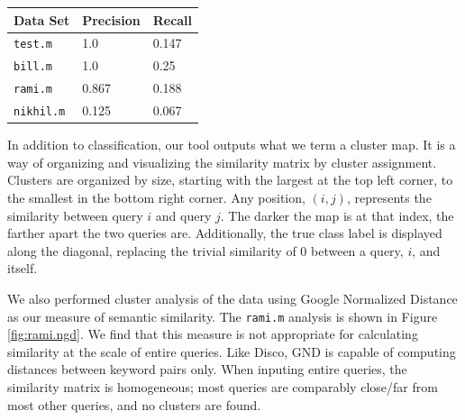 \documentclass[11pt]{article}
\begin{document}
\begin{multicols}{2}
\bigskip
\begin{centering}
    \begin{tabular}{ | l | l | l |}
    \hline
    {\bf Data Set} & {\bf Precision} & {\bf Recall} \\ \hline
    \texttt{test.m} & 1.0 & 0.147 \\ \hline
    \texttt{bill.m} & 1.0 & 0.25 \\ \hline
    \texttt{rami.m} & 0.867 & 0.188 \\ \hline
    \texttt{nikhil.m} & 0.125 & 0.067 \\ \hline
    \end{tabular}
\end{centering}
\bigskip

In addition to classification, our tool outputs what we term a cluster
map. It is a way of organizing and visualizing the similarity matrix
by cluster assignment. Clusters are organized by size, starting with
the largest at the top left corner, to the smallest in the bottom
right corner. Any position, $(i,j)$, represents the similarity between
query $i$ and query $j$. The darker the map is at that index, the
farther apart the two queries are. Additionally, the true class label
is displayed along the diagonal, replacing the trivial similarity of 0
between a query, $i$, and itself.

We also performed cluster analysis of the data using Google Normalized
Distance as our measure of semantic similarity. The \texttt{rami.m}
analysis is shown in Figure \ref{fig:rami.ngd}. We find that this
measure is not appropriate for calculating similarity at the scale of
entire queries. Like Disco, GND is capable of computing distances
between keyword pairs only. When inputing entire queries, the similarity
matrix is homogeneous; most queries are comparably close/far from most
other queries, and no clusters are found.


\end{multicols}
\end{document}
